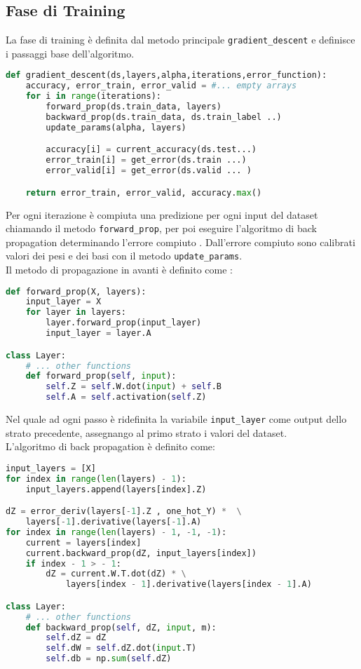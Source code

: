 \subsection{Fase di Training}
La fase di training è definita dal metodo principale \texttt{gradient\_descent} e definisce i passaggi base dell'algoritmo.
\begin{lstlisting}[language=Python]
def gradient_descent(ds,layers,alpha,iterations,error_function):
    accuracy, error_train, error_valid = #... empty arrays
    for i in range(iterations):
        forward_prop(ds.train_data, layers)
        backward_prop(ds.train_data, ds.train_label ..)
        update_params(alpha, layers)

        accuracy[i] = current_accuracy(ds.test...)
        error_train[i] = get_error(ds.train ...)
        error_valid[i] = get_error(ds.valid ... )

    return error_train, error_valid, accuracy.max()
\end{lstlisting}
Per ogni iterazione è compiuta una predizione per ogni input del dataset chiamando il metodo \texttt{forward\_prop}, per poi eseguire l'algoritmo di back propagation determinando l'errore compiuto . Dall'errore compiuto sono calibrati valori dei pesi e dei basi con il metodo \texttt{update\_params}. \\
Il metodo di propagazione in avanti è definito come :
\begin{lstlisting}[language=Python]
def forward_prop(X, layers):
    input_layer = X
    for layer in layers:
        layer.forward_prop(input_layer)
        input_layer = layer.A

class Layer:
    # ... other functions
    def forward_prop(self, input):
        self.Z = self.W.dot(input) + self.B
        self.A = self.activation(self.Z)
\end{lstlisting}
Nel quale ad ogni passo è ridefinita la variabile \texttt{input\_layer} come output dello strato precedente, assegnango al primo strato i valori del dataset. \\
L'algoritmo di back propagation è definito come:
\begin{lstlisting}[language=Python]
input_layers = [X]
for index in range(len(layers) - 1):
    input_layers.append(layers[index].Z)

dZ = error_deriv(layers[-1].Z , one_hot_Y) *  \
    layers[-1].derivative(layers[-1].A)
for index in range(len(layers) - 1, -1, -1):
    current = layers[index]
    current.backward_prop(dZ, input_layers[index])
    if index - 1 > - 1:
        dZ = current.W.T.dot(dZ) * \
            layers[index - 1].derivative(layers[index - 1].A)

class Layer:
    # ... other functions
    def backward_prop(self, dZ, input, m):
        self.dZ = dZ
        self.dW = self.dZ.dot(input.T)
        self.db = np.sum(self.dZ)
\end{lstlisting}
